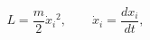 \begin{equation}
L=\frac{m}{2}\dot{x}_i{}^2,\qquad \dot{x}_i=\frac{dx_i}{dt},
\label{mnr}
\end{equation}

